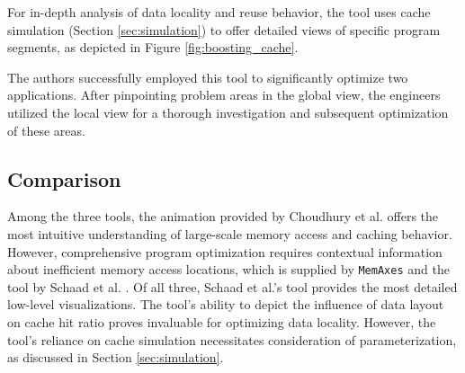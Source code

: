 For in-depth analysis of data locality and reuse behavior, the tool uses cache simulation (Section \ref{sec:simulation}) to offer detailed views of specific program segments, as depicted in Figure \ref{fig:boosting_cache}.

The authors successfully employed this tool to significantly optimize two applications. After pinpointing problem areas in the global view, the engineers utilized the local view for a thorough investigation and subsequent optimization of these areas.

\subsection{Comparison}\label{sec:comparison}
Among the three tools, the animation provided by Choudhury et al. \cite{choudhury2011abstract} offers the most intuitive understanding of large-scale memory access and caching behavior. However, comprehensive program optimization requires contextual information about inefficient memory access locations, which is supplied by \texttt{MemAxes} \cite{gimenez2017memaxes} and the tool by Schaad et al. \cite{schaad2021boosting}. Of all three, Schaad et al.'s tool provides the most detailed low-level visualizations. The tool's ability to depict the influence of data layout on cache hit ratio proves invaluable for optimizing data locality. However, the tool's reliance on cache simulation necessitates consideration of parameterization, as discussed in Section \ref{sec:simulation}.